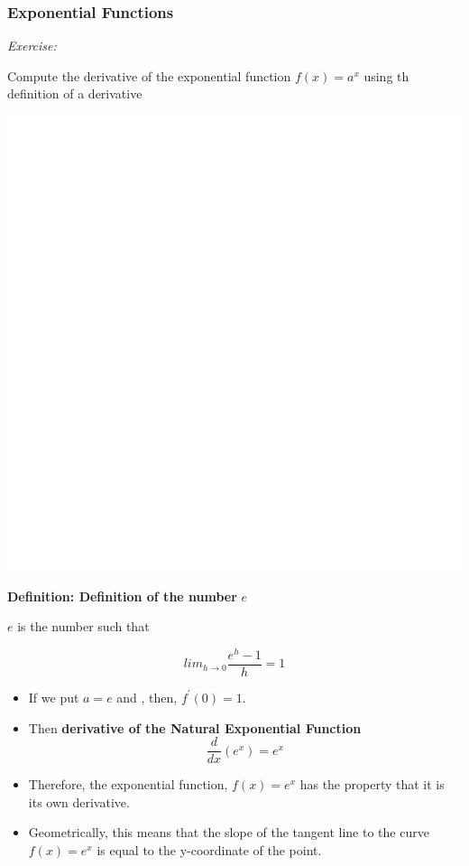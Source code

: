 \documentclass[]{book}
\begin{document}
\newpage

\hypertarget{exponential-functions}{%
\subsubsection{Exponential Functions}\label{exponential-functions}}

\emph{Exercise:}

Compute the derivative of the exponential function \(f(x) = a^x\) using th definition of a derivative

\begin{center}\includegraphics[width=1\linewidth]{figure/LB14-1} \end{center}

\textbf{Definition: Definition of the number} \(e\)

\(e\) is the number such that

\[lim_{h\to 0}\frac{e^h -1}{h}=1\]

\begin{itemize}
\item
  If we put \(a=e\) and , then, \(f^\prime(0)=1\).
\item
  Then \textbf{derivative of the Natural Exponential Function}
  \[\frac{d}{dx}(e^x)= e^x\]
\item
  Therefore, the exponential function, \(f(x) = e^x\) has the property that it is its own derivative.
\item
  Geometrically, this means that the slope of the tangent line to the curve \(f(x) = e^x\) is equal to the y-coordinate of the point.
\end{itemize}
\end{document}
